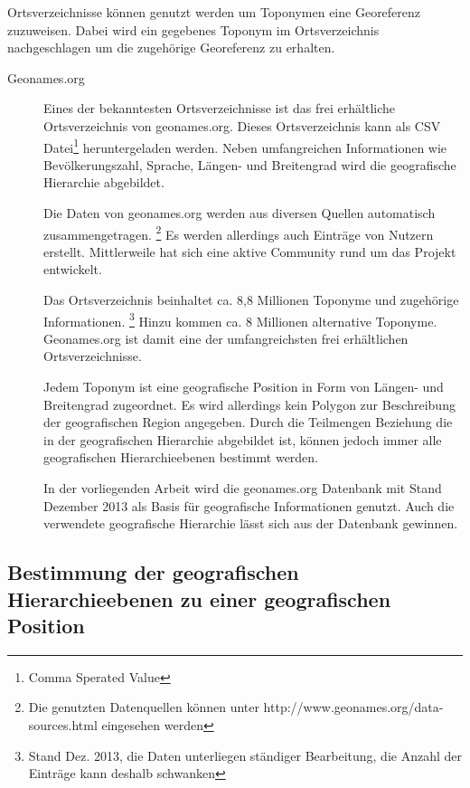 			Ortsverzeichnisse können genutzt werden um Toponymen eine Georeferenz zuzuweisen. 
			Dabei wird ein gegebenes Toponym im Ortsverzeichnis nachgeschlagen um die zugehörige Georeferenz zu erhalten.  

			\begin{description}

				\item[Geonames.org]
					
					Eines der bekanntesten Ortsverzeichnisse ist das frei erhältliche Ortsverzeichnis von geonames.org. 
					Dieses Ortsverzeichnis kann als CSV Datei\footnote{Comma Sperated Value} heruntergeladen werden.
					Neben umfangreichen Informationen wie Bevölkerungszahl, Sprache, Längen- und Breitengrad wird die geografische Hierarchie abgebildet.

					Die Daten von geonames.org werden aus diversen Quellen automatisch zusammengetragen. \footnote{Die genutzten Datenquellen können unter http://www.geonames.org/data-sources.html eingesehen werden} 
					Es werden allerdings auch Einträge von Nutzern erstellt. 
					Mittlerweile hat sich eine aktive Community rund um das Projekt entwickelt. 

					Das Ortsverzeichnis beinhaltet ca. 8,8 Millionen Toponyme und zugehörige Informationen. \footnote{Stand Dez. 2013, die Daten unterliegen ständiger Bearbeitung, die Anzahl der Einträge kann deshalb schwanken} 
					Hinzu kommen ca. 8 Millionen alternative Toponyme.
					Geonames.org ist damit eine der umfangreichsten frei erhältlichen Ortsverzeichnisse.

					Jedem Toponym ist eine geografische Position in Form von Längen- und Breitengrad zugeordnet. 
					Es wird allerdings kein Polygon zur Beschreibung der geografischen Region angegeben.
					Durch die Teilmengen Beziehung die in der geografischen Hierarchie abgebildet ist, können jedoch immer alle geografischen Hierarchieebenen bestimmt werden.

					In der vorliegenden Arbeit wird die geonames.org Datenbank mit Stand Dezember 2013 als Basis für geografische Informationen genutzt.
					Auch die verwendete geografische Hierarchie lässt sich aus der Datenbank gewinnen.

			\end{description}
			
		\subsection{Bestimmung der geografischen Hierarchieebenen zu einer geografischen Position} 
			
